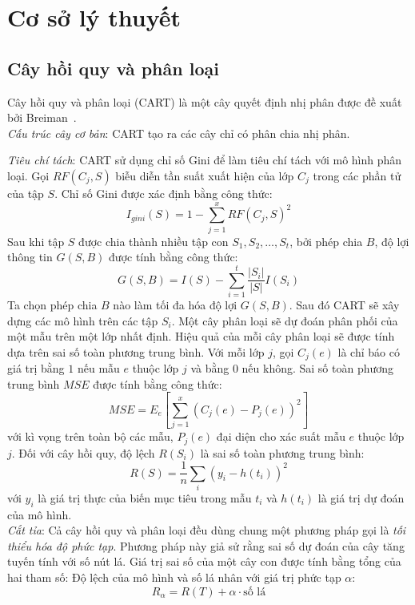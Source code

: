 \chapter{Cơ sở lý thuyết} 
\section{Cây hồi quy và phân loại}
Cây hồi quy và phân loại (CART) là một cây quyết định nhị phân được đề xuất bởi Breiman~\cite{23}.\\


\textit{Cấu trúc cây cơ bản}: CART tạo ra các cây chỉ có phân chia nhị phân. 



\textit{Tiêu chí tách}: CART sử dụng chỉ số Gini để làm tiêu chí tách với mô hình phân loại. Gọi $RF(C_j,S)$ biễu diễn tần suất xuất hiện của lớp $C_j$ trong các phần tử của tập $S$. Chỉ số Gini được xác định bằng công thức:
$$I_{gini}(S)=1- \sum^x_{j=1}RF(C_j,S)^2$$
Sau khi tập $S$ được chia thành nhiều tập con $S_1,S_2,\ldots,S_t$, bởi phép chia $B$, độ lợi thông tin $G(S,B)$ được tính bằng công thức:
$$G(S,B) = I(S) - \sum^t_{i=1}\frac{|S_i|}{|S|}I(S_i)$$
Ta chọn phép chia $B$ nào làm tối đa hóa độ lợi $G(S,B)$.
Sau đó CART sẽ xây dựng các mô hình trên các tập $S_i$. Một cây phân loại sẽ dự đoán phân phối của một mẫu trên một lớp nhất định. Hiệu quả của mỗi cây phân loại sẽ được tính dựa trên sai số toàn phương trung bình. Với mỗi lớp $j$, gọi $C_j(e)$ là chỉ báo có giá trị bằng $1$ nếu mẫu $e$ thuộc lớp $j$ và bằng $0$ nếu không. Sai số toàn phương trung bình $MSE$ được tính bằng công thức:
$$MSE=E_e\left[\sum^x_{j=1}(C_j(e)-P_j(e))^2\right]$$
với kì vọng trên toàn bộ các mẫu, $P_j(e)$ đại diện cho xác suất mẫu $e$ thuộc lớp $j$. Đối với cây hồi quy, độ lệch  $R(S_i)$ là sai số toàn phương trung bình:
$$R(S) = \frac{1}{n}\sum_i(y_i - h(t_i))^2$$
với $y_i$ là giá trị thực của biến mục tiêu trong mẫu $t_i$ và $h(t_i)$ là giá trị dự đoán của mô hình.\\
\textit{Cắt tỉa}: Cả cây hồi quy và phân loại đều dùng chung một phương pháp gọi là \textit{tối thiểu hóa độ phức tạp}. Phương pháp này giả sử rằng sai số dự đoán của cây tăng tuyến tính với số nút lá. Giá trị sai số của một cây con được tính bằng tổng của hai tham số: Độ lệch của mô hình và số lá nhân với giá trị phức tạp $\alpha$:
$$R_\alpha = R(T) + \alpha\cdot\text{số lá}$$




